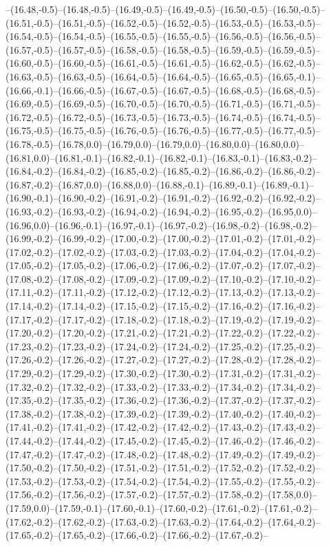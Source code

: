 --(16.48,-0.5)--(16.48,-0.5)--(16.49,-0.5)--(16.49,-0.5)--(16.50,-0.5)--(16.50,-0.5)--(16.51,-0.5)--(16.51,-0.5)--(16.52,-0.5)--(16.52,-0.5)--(16.53,-0.5)--(16.53,-0.5)--(16.54,-0.5)--(16.54,-0.5)--(16.55,-0.5)--(16.55,-0.5)--(16.56,-0.5)--(16.56,-0.5)--(16.57,-0.5)--(16.57,-0.5)--(16.58,-0.5)--(16.58,-0.5)--(16.59,-0.5)--(16.59,-0.5)--(16.60,-0.5)--(16.60,-0.5)--(16.61,-0.5)--(16.61,-0.5)--(16.62,-0.5)--(16.62,-0.5)--(16.63,-0.5)--(16.63,-0.5)--(16.64,-0.5)--(16.64,-0.5)--(16.65,-0.5)--(16.65,-0.1)--(16.66,-0.1)--(16.66,-0.5)--(16.67,-0.5)--(16.67,-0.5)--(16.68,-0.5)--(16.68,-0.5)--(16.69,-0.5)--(16.69,-0.5)--(16.70,-0.5)--(16.70,-0.5)--(16.71,-0.5)--(16.71,-0.5)--(16.72,-0.5)--(16.72,-0.5)--(16.73,-0.5)--(16.73,-0.5)--(16.74,-0.5)--(16.74,-0.5)--(16.75,-0.5)--(16.75,-0.5)--(16.76,-0.5)--(16.76,-0.5)--(16.77,-0.5)--(16.77,-0.5)--(16.78,-0.5)--(16.78,0.0)--(16.79,0.0)--(16.79,0.0)--(16.80,0.0)--(16.80,0.0)--(16.81,0.0)--(16.81,-0.1)--(16.82,-0.1)--(16.82,-0.1)--(16.83,-0.1)--(16.83,-0.2)--(16.84,-0.2)--(16.84,-0.2)--(16.85,-0.2)--(16.85,-0.2)--(16.86,-0.2)--(16.86,-0.2)--(16.87,-0.2)--(16.87,0.0)--(16.88,0.0)--(16.88,-0.1)--(16.89,-0.1)--(16.89,-0.1)--(16.90,-0.1)--(16.90,-0.2)--(16.91,-0.2)--(16.91,-0.2)--(16.92,-0.2)--(16.92,-0.2)--(16.93,-0.2)--(16.93,-0.2)--(16.94,-0.2)--(16.94,-0.2)--(16.95,-0.2)--(16.95,0.0)--(16.96,0.0)--(16.96,-0.1)--(16.97,-0.1)--(16.97,-0.2)--(16.98,-0.2)--(16.98,-0.2)--(16.99,-0.2)--(16.99,-0.2)--(17.00,-0.2)--(17.00,-0.2)--(17.01,-0.2)--(17.01,-0.2)--(17.02,-0.2)--(17.02,-0.2)--(17.03,-0.2)--(17.03,-0.2)--(17.04,-0.2)--(17.04,-0.2)--(17.05,-0.2)--(17.05,-0.2)--(17.06,-0.2)--(17.06,-0.2)--(17.07,-0.2)--(17.07,-0.2)--(17.08,-0.2)--(17.08,-0.2)--(17.09,-0.2)--(17.09,-0.2)--(17.10,-0.2)--(17.10,-0.2)--(17.11,-0.2)--(17.11,-0.2)--(17.12,-0.2)--(17.12,-0.2)--(17.13,-0.2)--(17.13,-0.2)--(17.14,-0.2)--(17.14,-0.2)--(17.15,-0.2)--(17.15,-0.2)--(17.16,-0.2)--(17.16,-0.2)--(17.17,-0.2)--(17.17,-0.2)--(17.18,-0.2)--(17.18,-0.2)--(17.19,-0.2)--(17.19,-0.2)--(17.20,-0.2)--(17.20,-0.2)--(17.21,-0.2)--(17.21,-0.2)--(17.22,-0.2)--(17.22,-0.2)--(17.23,-0.2)--(17.23,-0.2)--(17.24,-0.2)--(17.24,-0.2)--(17.25,-0.2)--(17.25,-0.2)--(17.26,-0.2)--(17.26,-0.2)--(17.27,-0.2)--(17.27,-0.2)--(17.28,-0.2)--(17.28,-0.2)--(17.29,-0.2)--(17.29,-0.2)--(17.30,-0.2)--(17.30,-0.2)--(17.31,-0.2)--(17.31,-0.2)--(17.32,-0.2)--(17.32,-0.2)--(17.33,-0.2)--(17.33,-0.2)--(17.34,-0.2)--(17.34,-0.2)--(17.35,-0.2)--(17.35,-0.2)--(17.36,-0.2)--(17.36,-0.2)--(17.37,-0.2)--(17.37,-0.2)--(17.38,-0.2)--(17.38,-0.2)--(17.39,-0.2)--(17.39,-0.2)--(17.40,-0.2)--(17.40,-0.2)--(17.41,-0.2)--(17.41,-0.2)--(17.42,-0.2)--(17.42,-0.2)--(17.43,-0.2)--(17.43,-0.2)--(17.44,-0.2)--(17.44,-0.2)--(17.45,-0.2)--(17.45,-0.2)--(17.46,-0.2)--(17.46,-0.2)--(17.47,-0.2)--(17.47,-0.2)--(17.48,-0.2)--(17.48,-0.2)--(17.49,-0.2)--(17.49,-0.2)--(17.50,-0.2)--(17.50,-0.2)--(17.51,-0.2)--(17.51,-0.2)--(17.52,-0.2)--(17.52,-0.2)--(17.53,-0.2)--(17.53,-0.2)--(17.54,-0.2)--(17.54,-0.2)--(17.55,-0.2)--(17.55,-0.2)--(17.56,-0.2)--(17.56,-0.2)--(17.57,-0.2)--(17.57,-0.2)--(17.58,-0.2)--(17.58,0.0)--(17.59,0.0)--(17.59,-0.1)--(17.60,-0.1)--(17.60,-0.2)--(17.61,-0.2)--(17.61,-0.2)--(17.62,-0.2)--(17.62,-0.2)--(17.63,-0.2)--(17.63,-0.2)--(17.64,-0.2)--(17.64,-0.2)--(17.65,-0.2)--(17.65,-0.2)--(17.66,-0.2)--(17.66,-0.2)--(17.67,-0.2)--